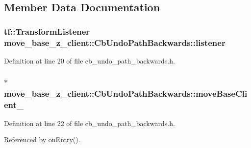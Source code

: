 \subsection{Member Data Documentation}
\subsubsection[{\texorpdfstring{listener}{listener}}]{\setlength{\rightskip}{0pt plus 5cm}tf\+::\+Transform\+Listener move\+\_\+base\+\_\+z\+\_\+client\+::\+Cb\+Undo\+Path\+Backwards\+::listener\hspace{0.3cm}{\ttfamily [private]}}\hypertarget{classmove__base__z__client_1_1CbUndoPathBackwards_a197e2034e873c09de896e7a8b6fe898f}{}\label{classmove__base__z__client_1_1CbUndoPathBackwards_a197e2034e873c09de896e7a8b6fe898f}


Definition at line 20 of file cb\+\_\+undo\+\_\+path\+\_\+backwards.\+h.

\subsubsection[{\texorpdfstring{move\+Base\+Client\+\_\+}{moveBaseClient_}}]{$\ast$ move\+\_\+base\+\_\+z\+\_\+client\+::\+Cb\+Undo\+Path\+Backwards\+::move\+Base\+Client\+\_\+\hspace{0.3cm}{\ttfamily [private]}}\hypertarget{classmove__base__z__client_1_1CbUndoPathBackwards_a19e7ace85698725a1d2730a7c6b3aa7d}{}\label{classmove__base__z__client_1_1CbUndoPathBackwards_a19e7ace85698725a1d2730a7c6b3aa7d}


Definition at line 22 of file cb\+\_\+undo\+\_\+path\+\_\+backwards.\+h.



Referenced by on\+Entry().



